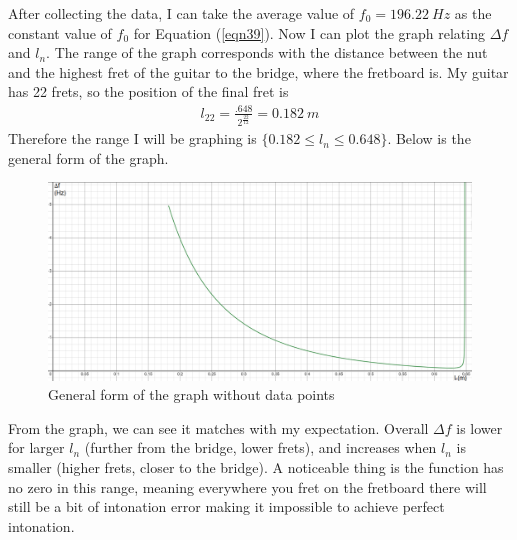 After collecting the data, I can take the average value of $f_0 = \SI{196.22}{Hz}$ as the constant value of $f_0$ for Equation (\ref{eqn39}). Now I can plot the graph relating $\Delta f$ and $l_n$. The range of the graph corresponds with the distance between the nut and the highest fret of the guitar to the bridge, where the fretboard is. My guitar has 22 frets, so the position of the final fret is
\begin{align*}
    l_{22} = \frac{.648}{2^{\frac{22}{12}}} = \SI{0.182}{m}
\end{align*} 
Therefore the range I will be graphing is $\{0.182 \le l_n \le 0.648 \}$. Below is the general form of the graph.\par
\FloatBarrier
\begin{figure}[!ht]
    \includegraphics[width = \textwidth]{./ee/no_data_graph.png}
    \caption{General form of the graph without data points} \label{fig7}
\end{figure}
\FloatBarrier
From the graph, we can see it matches with my expectation. Overall $\Delta f$ is lower for larger $l_n$ (further from the bridge, lower frets), and increases when $l_n$ is smaller (higher frets, closer to the bridge). A noticeable thing is the function has no zero in this range, meaning everywhere you fret on the fretboard there will still be a bit of intonation error making it impossible to achieve perfect intonation.\par
